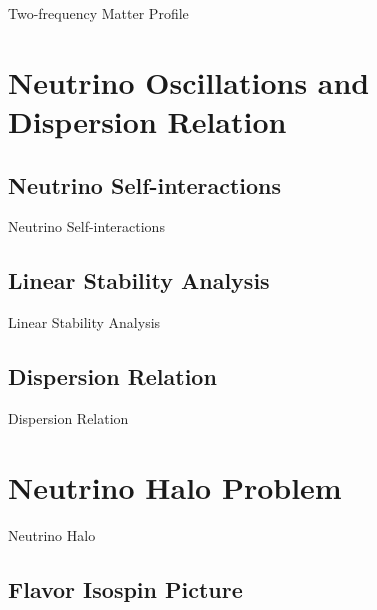 \documentclass[9pt]{beamer}
\begin{document}
\begin{darkframes}
\begin{frame}{Two-frequency Matter Profile}
\end{frame}







\section{Neutrino Oscillations and Dispersion Relation}

\subsection{Neutrino Self-interactions}

\begin{frame}{Neutrino Self-interactions}

    
\end{frame}


\subsection{Linear Stability Analysis}

\begin{frame}{Linear Stability Analysis}

    
\end{frame}

\subsection{Dispersion Relation}

\begin{frame}{Dispersion Relation}
    
\end{frame}






\section{Neutrino Halo Problem}



\begin{frame}{Neutrino Halo}

\end{frame}

\subsection{Flavor Isospin Picture}


\end{darkframes}
\end{document}
